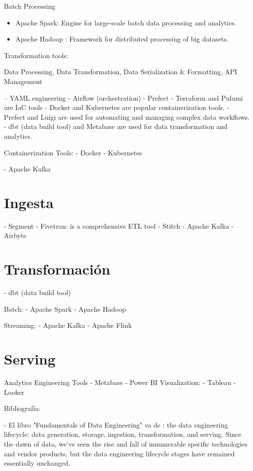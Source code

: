\documentclass[12pt]{book}
\begin{document}
Batch Processing
\begin{itemize}
    \item Apache Spark: Engine for large-scale batch data processing and analytics.
    \item Apache Hadoop : Framework for distributed processing of big datasets.
\end{itemize}

Transformation tools:


Data Processing, Data Transformation, Data Serialization & Formatting, API Management

--  YAML engineering 
- Airflow (orchestration)
- Prefect
- Terraform and Pulumi are IaC tools
- Docker and Kubernetes are popular containerization tools.
- Prefect and Luigi are used for automating and managing complex data workflows.
- dbt (data build tool) and Metabase are used for data transformation and analytics.


Containerization Tools:
- Docker
- Kubernetes


- Apache Kafka


\section{Ingesta}
- Segment
- Fivetran: is a comprehensive ETL tool
- Stitch
- Apache Kafka
- Airbyte 
\section{Transformación}

- dbt (data build tool)

Batch:
- Apache Spark
- Apache Hadoop

Streaming:
- Apache Kafka
- Apache Flink

\section{Serving}
Analytics Engineering Tools
- Metabase
- Power BI
Visualization:
- Tableau
- Looker


Bibliografía: 

- El libro "Fundamentals of Data Engineering" va de : the data engineering lifecycle: data generation, storage, ingestion, transformation, and serving. Since the dawn of data, we've seen the rise and fall of innumerable specific technologies and vendor products, but the data engineering lifecycle stages have remained essentially unchanged. 
\end{document}

